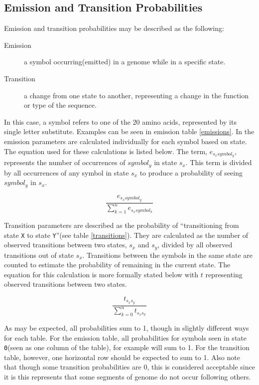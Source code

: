 \documentclass[a4paper,11pt]{article}
\begin{document}
\subsection{Emission and Transition Probabilities}
Emission and transition probabilities may be described as the following:

\begin{description}
    \item[Emission] a symbol occurring(emitted) in a genome while in a specific state.
    \item[Transition] a change from one state to another, representing a change in the function or type of the sequence.
\end{description}

In this case, a symbol refers to one of the 20 amino acids, represented by its single letter substitute. Examples can be seen in emission table \ref{emissions}. In the emission parameters are calculated individually for each symbol based on state. The equation used for these calculations is listed below. The term, $e_{s_{x}symbol_y}$, represents the number of occurrences of $symbol_y$ in state $s_x$. This term is divided by all occurrences of any symbol in state $s_x$ to produce a probability of seeing $symbol_y$ in $s_x$.

\begin{equation}
    \frac{e_{s_{x}symbol_y}}{\sum_{k=1}^n e_{s_xsymbol_k}}
\end{equation}


Transition parameters are described as the probability of ``transitioning from state \verb+X+ to state \verb+Y+''(see table \ref{transitions}). They are calculated as the number of observed transitions between two states, $s_x$ and $s_y$, divided by all observed transitions out of state $s_x$. Transitions between the symbols in the same state are counted to estimate the probability of remaining in the current state. The equation for this calculation is more formally stated below with $t$ representing observed transitions between two states.

\begin{equation}
    \frac{t_{s_{x}s_{y}}}{\sum_{k = 0}^{n} t_{s_{x}s_{k}}}
\end{equation}

As may be expected, all probabilities sum to 1, though in slightly different ways for each table. For the emission table, all probabilities for symbols seen in state \verb+0+(seen as one column of the table), for example will sum to 1. For the transition table, however, one horizontal row should be expected to sum to 1. Also note that though some transition probabilities are 0, this is considered acceptable since it is this represents that some segments of genome do not occur following others.
\end{document}
